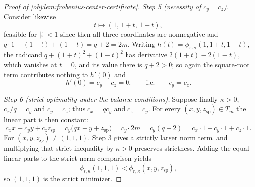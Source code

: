 \begin{proof}[Proof of \cref{obj:lem:frobenius-center-certificate}]
\emph{Step 5 (necessity of \(c_y=c_z\)).}  Consider likewise
\[
t\longmapsto(1,\,1+t,\,1-t),
\]
feasible for \(|t|<1\) since then all three coordinates are nonnegative and \(q\cdot1+(1+t)+(1-t)=q+2=2m\).  Writing \(h(t)=\phi_{r,\kappa}(1,1+t,1-t)\), the radicand \(q+(1+t)^2+(1-t)^2\) has derivative \(2(1+t)-2(1-t)\), which vanishes at \(t=0\), and its value there is \(q+2>0\); so again the square-root term contributes nothing to \(h'(0)\) and
\[
h'(0)=c_y-c_z=0,
\qquad\text{i.e.}\qquad
c_y=c_z .
\]

\emph{Step 6 (strict optimality under the balance conditions).}  Suppose finally \(\kappa>0\), \(c_x/q=c_y\) and \(c_y=c_z\); thus \(c_x=qc_y\) and \(c_z=c_y\).  For every \((x,y,z_{\mathrm{sp}})\in T_m\) the linear part is then constant:
\[
c_xx+c_yy+c_zz_{\mathrm{sp}}
=c_y\bigl(qx+y+z_{\mathrm{sp}}\bigr)
=c_y\cdot 2m
=c_y(q+2)
=c_x\cdot1+c_y\cdot1+c_z\cdot1 .
\]
For \((x,y,z_{\mathrm{sp}})\ne(1,1,1)\), Step 3 gives a strictly larger norm term, and multiplying that strict inequality by \(\kappa>0\) preserves strictness.  Adding the equal linear parts to the strict norm comparison yields
\[
\phi_{r,\kappa}(1,1,1)<\phi_{r,\kappa}(x,y,z_{\mathrm{sp}}),
\]
so \((1,1,1)\) is the strict minimizer. %
\end{proof}

